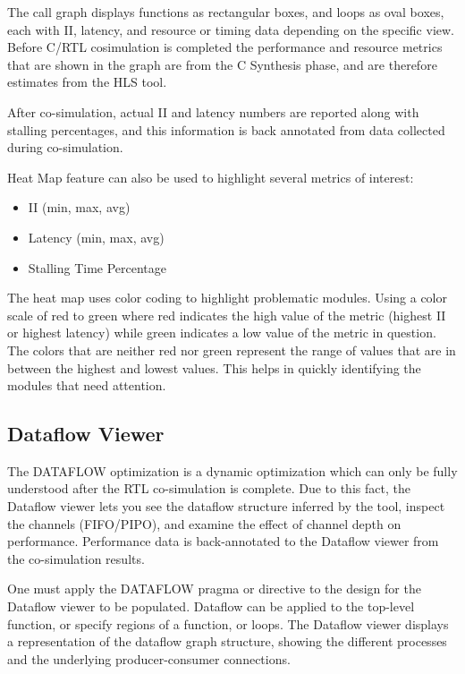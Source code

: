 \par The call graph displays functions as rectangular boxes, and loops as oval boxes, each with II, latency, and resource or timing data depending on the specific view. Before C/RTL cosimulation is completed the performance and resource metrics that are shown in the graph are from the C Synthesis phase, and are therefore estimates from the HLS tool.

\par After co-simulation, actual II and latency numbers are reported along with stalling percentages, and this information is back annotated from data collected during co-simulation. 

\par Heat Map feature can also be used to highlight several metrics of interest:
\begin{itemize}
  \item II (min, max, avg)
  \item Latency (min, max, avg)
  \item Stalling Time Percentage
\end{itemize}

The heat map uses color coding to highlight problematic modules. Using a color scale of red to green where red indicates the high value of the metric (\ie highest II or highest latency) while green indicates a low value of the metric in question. The colors that are neither red nor green
represent the range of values that are in between the highest and lowest values. This helps in quickly identifying the modules that need attention. 


\subsection{Dataflow Viewer}
The DATAFLOW optimization is a dynamic optimization which can only be fully understood after the RTL co-simulation is complete. Due to this fact, the Dataflow viewer lets you see the dataflow structure inferred by the tool, inspect the channels (FIFO/PIPO), and examine the effect
of channel depth on performance. Performance data is back-annotated to the Dataflow viewer from the co-simulation results.

\par One must apply the DATAFLOW pragma or directive to the design for the Dataflow viewer to be populated. Dataflow can be applied to the top-level function, or specify regions of a function, or loops. The Dataflow viewer displays a representation of the dataflow graph structure, showing
the different processes and the underlying producer-consumer connections.


